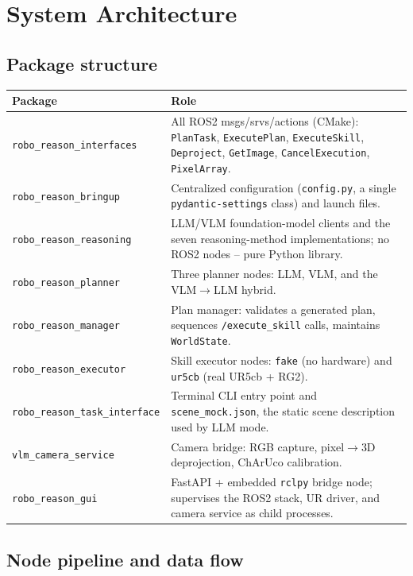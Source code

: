 \section{System Architecture}
\label{sec:architecture}

\subsection{Package structure}

\begin{longtable}{@{}p{4.2cm}p{10.8cm}@{}}
\toprule
\textbf{Package} & \textbf{Role} \\
\midrule
\endhead
\texttt{robo\_reason\_interfaces} & All ROS2 msgs/srvs/actions (CMake):
  \texttt{PlanTask}, \texttt{ExecutePlan}, \texttt{ExecuteSkill},
  \texttt{Deproject}, \texttt{GetImage}, \texttt{CancelExecution},
  \texttt{PixelArray}. \\
\texttt{robo\_reason\_bringup} & Centralized configuration
  (\texttt{config.py}, a single \texttt{pydantic-settings} class) and launch
  files. \\
\texttt{robo\_reason\_reasoning} & LLM/VLM foundation-model clients and the
  seven reasoning-method implementations; no ROS2 nodes -- pure Python
  library. \\
\texttt{robo\_reason\_planner} & Three planner nodes: LLM, VLM, and the
  VLM$\to$LLM hybrid. \\
\texttt{robo\_reason\_manager} & Plan manager: validates a generated plan,
  sequences \texttt{/execute\_skill} calls, maintains \texttt{WorldState}. \\
\texttt{robo\_reason\_executor} & Skill executor nodes: \texttt{fake} (no
  hardware) and \texttt{ur5cb} (real UR5cb + RG2). \\
\texttt{robo\_reason\_task\_interface} & Terminal CLI entry point and
  \texttt{scene\_mock.json}, the static scene description used by LLM mode. \\
\texttt{vlm\_camera\_service} & Camera bridge: RGB capture, pixel$\to$3D
  deprojection, ChArUco calibration. \\
\texttt{robo\_reason\_gui} & FastAPI + embedded \texttt{rclpy} bridge node;
  supervises the ROS2 stack, UR driver, and camera service as child
  processes. \\
\bottomrule
\end{longtable}

\subsection{Node pipeline and data flow}

